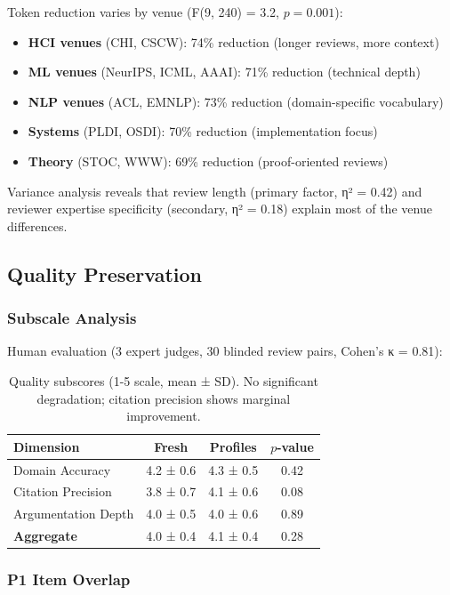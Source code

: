 Token reduction varies by venue (F(9, 240) = 3.2, $p = 0.001$):

\begin{itemize}
\item \textbf{HCI venues} (CHI, CSCW): 74\% reduction (longer reviews, more context)
\item \textbf{ML venues} (NeurIPS, ICML, AAAI): 71\% reduction (technical depth)
\item \textbf{NLP venues} (ACL, EMNLP): 73\% reduction (domain-specific vocabulary)
\item \textbf{Systems} (PLDI, OSDI): 70\% reduction (implementation focus)
\item \textbf{Theory} (STOC, WWW): 69\% reduction (proof-oriented reviews)
\end{itemize}

Variance analysis reveals that review length (primary factor, η² = 0.42) and reviewer expertise specificity (secondary, η² = 0.18) explain most of the venue differences.

\subsection{Quality Preservation}

\subsubsection{Subscale Analysis}

Human evaluation (3 expert judges, 30 blinded review pairs, Cohen's κ = 0.81):

\begin{table}[h]
\centering
\begin{tabular}{lccc}
\toprule
\textbf{Dimension} & \textbf{Fresh} & \textbf{Profiles} & \textbf{$p$-value} \\
\midrule
Domain Accuracy & 4.2 ± 0.6 & 4.3 ± 0.5 & 0.42 \\
Citation Precision & 3.8 ± 0.7 & 4.1 ± 0.6 & 0.08 \\
Argumentation Depth & 4.0 ± 0.5 & 4.0 ± 0.6 & 0.89 \\
\textbf{Aggregate} & 4.0 ± 0.4 & 4.1 ± 0.4 & 0.28 \\
\bottomrule
\end{tabular}
\caption{Quality subscores (1-5 scale, mean ± SD). No significant degradation; citation precision shows marginal improvement.}
\end{table}

\subsubsection{P1 Item Overlap}

